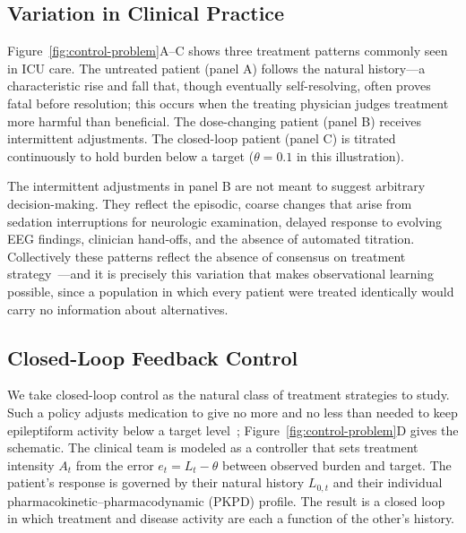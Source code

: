 \subsection{Variation in Clinical Practice}

Figure~\ref{fig:control-problem}A--C shows three treatment patterns commonly seen in ICU care. The
untreated patient (panel A) follows the natural history---a characteristic rise and fall that,
though eventually self-resolving, often proves fatal before resolution; this occurs when the
treating physician judges treatment more harmful than beneficial. The dose-changing patient (panel
B) receives intermittent adjustments. The closed-loop patient (panel C) is titrated continuously to
hold burden below a target ($\theta = 0.1$ in this illustration).

The intermittent adjustments in panel B are not meant to suggest arbitrary decision-making. They
reflect the episodic, coarse changes that arise from sedation interruptions for neurologic
examination, delayed response to evolving EEG findings, clinician hand-offs, and the absence of
automated titration. Collectively these patterns reflect the absence of consensus on treatment
strategy~\cite{chong2005which, rubinos2018ictal, osman2018ictal, johnson2017population, tao2020ictal, cormier2017ictal}---and
it is precisely this variation that makes observational learning possible, since a population in
which every patient were treated identically would carry no information about alternatives.

\subsection{Closed-Loop Feedback Control}

We take closed-loop control as the natural class of treatment strategies to study. Such a policy
adjusts medication to give no more and no less than needed to keep epileptiform activity below a
target level~\cite{astrom2010feedback, an2017design, westover2015robust, fialho2009closed};
Figure~\ref{fig:control-problem}D gives the schematic. The clinical team is modeled as a controller
that sets treatment intensity $A_t$ from the error $e_t = L_t - \theta$ between observed burden and
target. The patient's response is governed by their natural history $L_{0,t}$ and their individual
pharmacokinetic--pharmacodynamic (PKPD) profile. The result is a closed loop in which treatment and
disease activity are each a function of the other's history.


